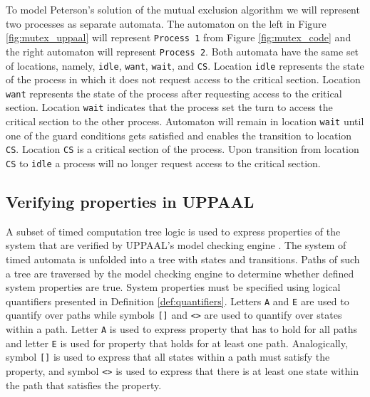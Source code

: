 \noindent
To model Peterson's solution of the mutual exclusion algorithm we will represent two processes as separate automata. The automaton on the left in Figure \ref{fig:mutex_uppaal} will represent \texttt{Process 1} from Figure \ref{fig:mutex_code} and the right automaton will represent \texttt{Process 2}. Both automata have the same set of locations, namely, \texttt{idle}, \texttt{want}, \texttt{wait}, and \texttt{CS}. Location \texttt{idle} represents the state of the process in which it does not request access to the critical section. Location \texttt{want} represents the state of the process after requesting access to the critical section. Location \texttt{wait} indicates that the process set the turn to access the critical section to the other process. Automaton will remain in location \texttt{wait} until one of the guard conditions gets satisfied and enables the transition to location \texttt{CS}. Location \texttt{CS} is a critical section of the process. Upon transition from location \texttt{CS} to \texttt{idle} a process will no longer request access to the critical section. 


\subsection{Verifying properties in UPPAAL}
A subset of timed computation tree logic is used to express properties of the system that are verified by UPPAAL's model checking engine \cite{Bengtsson2004}. The system of timed automata is unfolded into a tree with states and transitions. Paths of such a tree are traversed by the model checking engine to determine whether defined system properties are true. System properties must be specified using logical quantifiers presented in Definition \ref{def:quantifiers}. Letters \texttt{A} and \texttt{E} are used to quantify over paths while symbols \texttt{[]} and \texttt{<>} are used to quantify over states within a path. Letter \texttt{A} is used to express property that has to hold for all paths and letter \texttt{E} is used for property that holds for at least one path. Analogically, symbol \texttt{[]} is used to express that all states within a path must satisfy the property, and symbol \texttt{<>} is used to express that there is at least one state within the path that satisfies the property.

